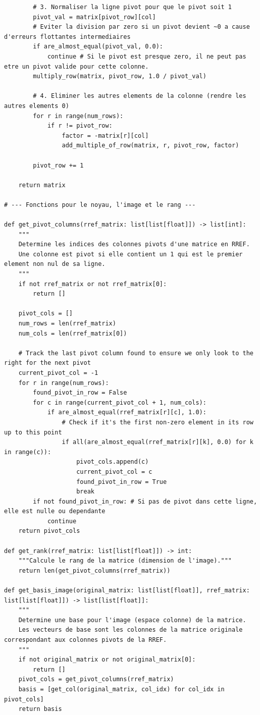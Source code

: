 \documentclass{report}
\begin{document}
\begin{verbatim}
        # 3. Normaliser la ligne pivot pour que le pivot soit 1
        pivot_val = matrix[pivot_row][col]
        # Eviter la division par zero si un pivot devient ~0 a cause d'erreurs flottantes intermediaires
        if are_almost_equal(pivot_val, 0.0):
            continue # Si le pivot est presque zero, il ne peut pas etre un pivot valide pour cette colonne.
        multiply_row(matrix, pivot_row, 1.0 / pivot_val)

        # 4. Eliminer les autres elements de la colonne (rendre les autres elements 0)
        for r in range(num_rows):
            if r != pivot_row:
                factor = -matrix[r][col]
                add_multiple_of_row(matrix, r, pivot_row, factor)

        pivot_row += 1

    return matrix

# --- Fonctions pour le noyau, l'image et le rang ---

def get_pivot_columns(rref_matrix: list[list[float]]) -> list[int]:
    """
    Determine les indices des colonnes pivots d'une matrice en RREF.
    Une colonne est pivot si elle contient un 1 qui est le premier element non nul de sa ligne.
    """
    if not rref_matrix or not rref_matrix[0]:
        return []

    pivot_cols = []
    num_rows = len(rref_matrix)
    num_cols = len(rref_matrix[0])

    # Track the last pivot column found to ensure we only look to the right for the next pivot
    current_pivot_col = -1
    for r in range(num_rows):
        found_pivot_in_row = False
        for c in range(current_pivot_col + 1, num_cols):
            if are_almost_equal(rref_matrix[r][c], 1.0):
                # Check if it's the first non-zero element in its row up to this point
                if all(are_almost_equal(rref_matrix[r][k], 0.0) for k in range(c)):
                    pivot_cols.append(c)
                    current_pivot_col = c
                    found_pivot_in_row = True
                    break
        if not found_pivot_in_row: # Si pas de pivot dans cette ligne, elle est nulle ou dependante
            continue
    return pivot_cols

def get_rank(rref_matrix: list[list[float]]) -> int:
    """Calcule le rang de la matrice (dimension de l'image)."""
    return len(get_pivot_columns(rref_matrix))

def get_basis_image(original_matrix: list[list[float]], rref_matrix: list[list[float]]) -> list[list[float]]:
    """
    Determine une base pour l'image (espace colonne) de la matrice.
    Les vecteurs de base sont les colonnes de la matrice originale correspondant aux colonnes pivots de la RREF.
    """
    if not original_matrix or not original_matrix[0]:
        return []
    pivot_cols = get_pivot_columns(rref_matrix)
    basis = [get_col(original_matrix, col_idx) for col_idx in pivot_cols]
    return basis


\end{verbatim}
\end{document}
